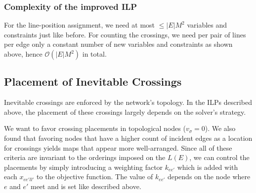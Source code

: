 \documentclass{llncs}
\begin{document}
\subsubsection{Complexity of the improved ILP}
For the line-position assignment, we need at most $\leq |E|M^{2}$ variables and constraints just like before. For counting the  crossings, we need per pair of lines per edge only a constant number of new variables and constraints as shown above, hence $\mathcal{O}(|E|M^{2})$ in total.

\subsection{Placement of Inevitable Crossings}\label{SEC:crossing_placement}

Inevitable crossings are enforced by the network's topology. In the ILPs described above, the placement of these crossings largely depends on the solver's strategy.

We want to favor crossing placements in topological nodes ($v_\sigma = 0$). We also found that favoring nodes that have a higher count of incident edges as a location for crossings yields maps that appear more well-arranged.
Since all of these criteria are invariant to the orderings imposed on the $L(E)$, we can control the placements by simply introducing a weighting factor $k_{ee'}$ which is added with each $x_{ee'll'}$ to the objective function.
The value of $k_{ee'}$ depends on the node where $e$ and $e'$ meet and is set like described above.
\end{document}
